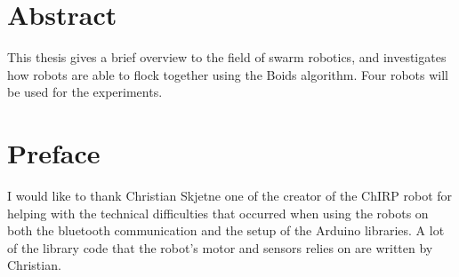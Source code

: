\section*{Abstract}
\label{sec:abstract}

This thesis gives a brief overview to the field of swarm robotics, and investigates how robots are able to flock together using the Boids algorithm.
Four robots will be used for the experiments.


%
%

\clearpage

\section*{Preface}



\vspace{1cm}


I would like to thank Christian Skjetne one of the creator of the ChIRP robot for helping with the technical difficulties that occurred when using the robots on both the bluetooth communication and the setup of the Arduino libraries. A lot of the library code that the robot's motor and sensors relies on are written by Christian.

